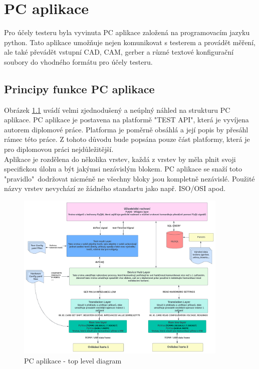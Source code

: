 \chapter{PC aplikace}
Pro účely testeru byla vyvinuta PC aplikace založená na programovacím jazyku python. Tato aplikace umožňuje
nejen komunikovat s testerem a provádět měření, ale také převádět vstupní CAD, CAM, gerber a různé textové konfigurační
soubory do vhodného formátu pro účely testeru.\\




\section{Principy funkce PC aplikace}
Obrázek \ref{fig: PCAPP top level diagram} uvádí velmi zjednodušený a neúplný náhled na strukturu PC aplikace.
PC aplikace je postavena na platformě "TEST API", která je vyvíjena autorem diplomové práce. Platforma je poměrně obsáhlá
a její popis by přesáhl rámec této práce. Z tohoto důvodu bude popsána pouze část platformy, která je pro diplomovou práci nejdůležitější.\\

Aplikace je rozdělena do několika vrstev, každá z vrstev by měla plnit svoji specifickou úlohu a být jakýmsi nezávislým blokem.
PC aplikace se snaží toto "pravidlo"\ dodržovat nicméně ne všechny bloky jsou kompletně nezávislé.
Použité názvy vrstev nevychází ze žádného standartu jako např. ISO/OSI apod.\\

\begin{figure}[ht!]
    \centering
    \includegraphics[width = 0.9\textwidth]{obrazky/PC_app_diagram.png}
    \caption{PC aplikace - top level diagram}
    \label{fig: PCAPP top level diagram}
\end{figure}


